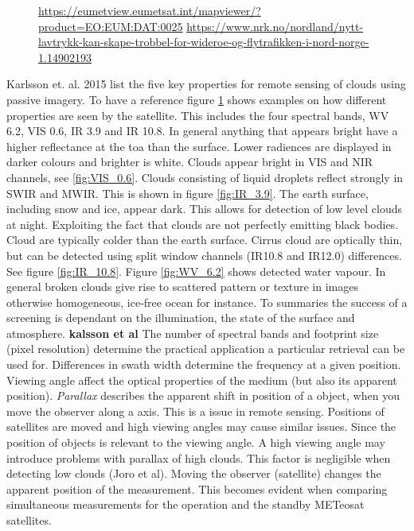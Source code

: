 \begin{figure}
{        %
        \href{https://eumetview.eumetsat.int/mapviewer/?product=EO:EUM:DAT:0025}{https://eumetview.eumetsat.int/mapviewer/?product=EO:EUM:DAT:0025}
        \href{https://www.nrk.no/nordland/nytt-lavtrykk-kan-skape-trobbel-for-wideroe-og-flytrafikken-i-nord-norge-1.14902193}{https://www.nrk.no/nordland/nytt-lavtrykk-kan-skape-trobbel-for-wideroe-og-flytrafikken-i-nord-norge-1.14902193}} 
        \label{fig:SEVIRI_channels}
    \end{figure}
Karlsson et. al. 2015 list the five key properties for remote sensing of clouds using passive imagery. To have a reference figure \ref{fig:SEVIRI_channels} shows examples on how different properties are seen by the satellite. This includes the four spectral bands, WV 6.2, VIS 0.6, IR 3.9 and IR 10.8. In general anything that appears bright have a higher reflectance at the \acrfull{toa} than the surface. Lower radiences are displayed in darker colours and brighter is white. Clouds appear bright in VIS and NIR channels, see \ref{fig:VIS_0.6}. Clouds consisting of liquid droplets reflect strongly in SWIR and MWIR. This is shown in figure \ref{fig:IR_3.9}. The earth surface, including snow and ice, appear dark. This allows for detection of low level clouds at night. Exploiting the fact that clouds are not perfectly emitting black bodies. Cloud are typically colder than the earth surface. Cirrus cloud are optically thin, but can be detected using split window channels (IR10.8 and IR12.0) differences. See figure \ref{fig:IR_10.8}. Figure \ref{fig:WV_6.2} shows detected water vapour. In general broken clouds give rise to scattered pattern or texture in images otherwise homogeneous, ice-free ocean for instance. To summaries the success of a screening is dependant on the illumination, the state of the surface and atmosphere. \textbf{kalsson et al} The number of spectral bands and footprint size (pixel resolution) determine the practical application a particular retrieval can be used for. Differences in swath width determine the frequency at a given position. Viewing angle affect the optical properties of the medium (but also its apparent position). \textit{Parallax} describes the apparent shift in position of a object, when you move the observer along a axis. This is a issue in remote sensing. Positions of satellites are moved and high viewing angles may cause similar issues. Since the position of objects is relevant to the viewing angle. A high viewing angle may introduce problems with parallax of high clouds. This factor is negligible when detecting low clouds (Joro et al). Moving the observer (satellite) changes the apparent position of the measurement. This becomes evident when comparing simultaneous measurements for the operation and the standby METeosat satellites.

